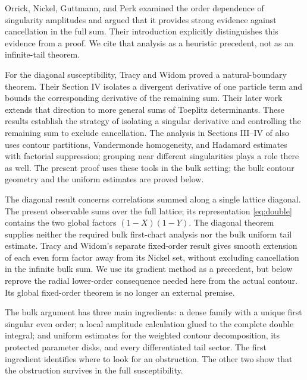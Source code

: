 \documentclass[11pt]{article}
\numberwithin{equation}{section}
\theoremstyle{definition}
\begin{document}
Orrick, Nickel, Guttmann, and Perk \cite[Section~3.2]{Orrick2001}
examined the order dependence of singularity amplitudes and argued
that it provides strong evidence against cancellation in the full sum.
Their introduction explicitly distinguishes this evidence from a proof.
We cite that analysis as a heuristic precedent, not as an infinite-tail
theorem.

For the diagonal susceptibility, Tracy and Widom \cite{TW2013}
proved a natural-boundary theorem. Their Section IV isolates a
divergent derivative of one particle term and bounds the corresponding
derivative of the remaining sum. Their later work
\cite{TW2017Toeplitz} extends that direction to more general sums
of Toeplitz determinants. These results establish the strategy of isolating a singular derivative
and controlling the remaining sum to exclude cancellation.
The analysis in Sections III--IV of \cite{TW2017Toeplitz} also uses
contour partitions, Vandermonde homogeneity, and Hadamard estimates
with factorial suppression; grouping near different singularities
plays a role there as well. The present proof uses these tools in the bulk setting; the bulk
contour geometry and the uniform estimates are proved below.

The diagonal result concerns correlations summed along a single
lattice diagonal. The present observable sums over the full lattice;
its representation \eqref{eq:double} contains the two global factors
\((1-X)(1-Y)\). The diagonal theorem supplies neither the required
bulk first-chart analysis nor the bulk uniform tail estimate.
Tracy and Widom's separate fixed-order result \cite{TW2014}
gives smooth extension of each even form factor away from its Nickel
set, without excluding cancellation in the infinite bulk sum.
We use its gradient method as a precedent, but below reprove the radial
lower-order consequence needed here from the actual contour. Its global
fixed-order theorem is no longer an external premise.

The bulk argument has three main ingredients: a dense family with a
unique first singular even order; a local amplitude calculation glued
to the complete double integral; and uniform estimates for the weighted
contour decomposition, its protected parameter disks, and every
differentiated tail sector. The first ingredient identifies where to
look for an obstruction. The other two show that the obstruction
survives in the full susceptibility.
\end{document}
